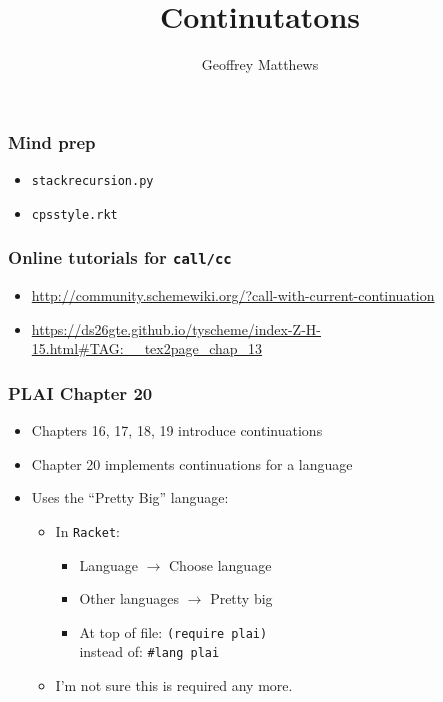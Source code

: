 \documentclass{beamer}
\title{Continutatons}
\author{Geoffrey Matthews}
\newcommand{\bi}{\begin{itemize}}
\newcommand{\li}{\item}
\newcommand{\ei}{\end{itemize}}
\newcommand{\bfr}[1]{\begin{frame}[fragile]\frametitle{{ #1 }}}
\begin{document}
\begin{frame}
\maketitle
\end{frame}


\bfr{Mind prep}

\bi
\li \tt stackrecursion.py
\li \tt cpsstyle.rkt
\ei

\end{frame}

\bfr{Online tutorials for \tt call/cc}

\centerline{}

\bi
\li \url{http://community.schemewiki.org/?call-with-current-continuation}
\li \url{https://ds26gte.github.io/tyscheme/index-Z-H-15.html#TAG:__tex2page_chap_13}
\ei
\end{frame}



\bfr{PLAI Chapter 20}

\bi
\li Chapters 16, 17, 18, 19 introduce continuations
\li Chapter 20 implements continuations for a language
\li Uses the ``Pretty Big'' language:
\bi
\li
In {\tt Racket}:
\bi
\li Language $\rightarrow$ Choose language
\li Other languages $\rightarrow$ Pretty big
\li At top of file: {\tt (require plai)}
\\ instead of: \verb|#lang plai| 
\ei
\li I'm not sure this is required any more.
\ei
\ei

\end{frame}
\end{document}
